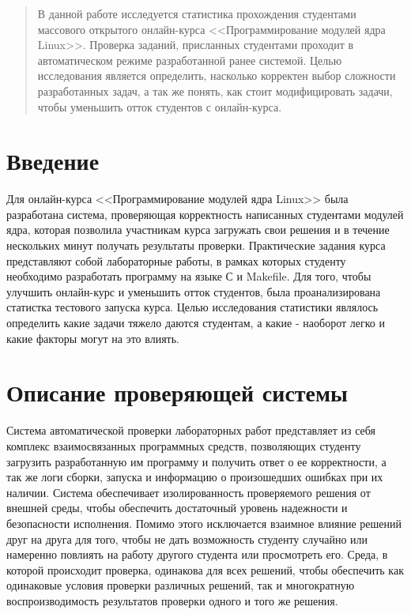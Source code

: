 \begin{abstract}
	
В данной работе исследуется статистика прохождения студентами массового открытого онлайн-курса <<Программирование модулей ядра Linux>>. Проверка заданий, присланных студентами проходит в автоматическом режиме разработанной ранее системой. Целью исследования является определить, насколько корректен выбор сложности разработанных задач, а так же понять, как стоит модифицировать задачи, чтобы уменьшить отток студентов с онлайн-курса.
\end{abstract}

\section{Введение}
Для онлайн-курса <<Программирование модулей ядра Linux>>\cite{stepic} была разработана система, проверяющая корректность написанных студентами модулей ядра, которая позволила участникам курса загружать свои решения и в течение нескольких минут получать результаты проверки. Практические задания курса представляют собой лабораторные работы, в рамках которых студенту необходимо разработать программу на языке С\cite{c} и Makefile\cite{makefile}. Для того, чтобы улучшить онлайн-курс и уменьшить отток студентов, была проанализирована статистка тестового запуска курса. Целью исследования статистики являлось определить какие задачи тяжело даются студентам, а какие - наоборот легко и какие факторы могут на это влиять.


\section{Описание проверяющей системы}
Система автоматической проверки лабораторных работ\cite{seim} представляет из себя комплекс взаимосвязанных программных средств, позволяющих студенту загрузить разработанную им программу и получить ответ о ее корректности, а так же логи сборки, запуска и информацию о произошедших ошибках при их наличии. Система обеспечивает изолированность проверяемого решения от внешней среды, чтобы обеспечить достаточный уровень надежности и безопасности исполнения. Помимо этого исключается взаимное влияние решений друг на друга для того, чтобы не дать возможность студенту случайно или намеренно повлиять на работу другого студента или просмотреть его. Среда, в которой происходит проверка, одинакова для всех решений, чтобы обеспечить как одинаковые условия проверки различных решений, так и многократную воспроизводимость результатов проверки одного и того же решения.

